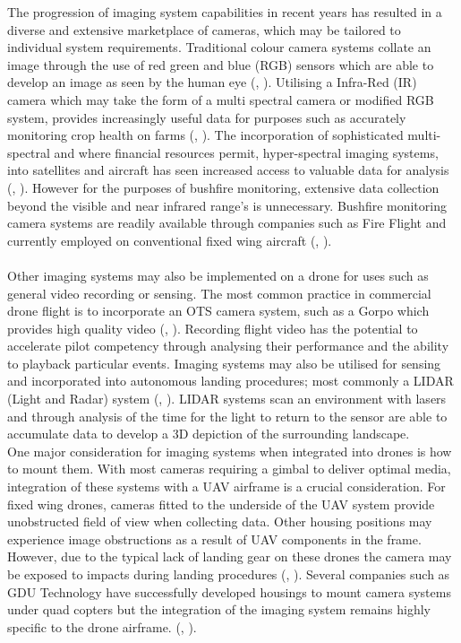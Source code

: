 The progression of imaging system capabilities in recent years has resulted in a diverse and extensive marketplace of cameras, which may be tailored to individual system requirements. Traditional colour camera systems collate an image through the use of red green and blue (RGB) sensors which are able to develop an image as seen by the human eye (\citeauthor{Sam1}, \citeyear{Sam1}). Utilising a Infra-Red (IR) camera which may take the form of a multi spectral camera or modified RGB system, provides increasingly useful data for purposes such as accurately monitoring crop health on farms (\citeauthor{Sam1}, \citeyear{Sam1}). The incorporation of sophisticated multi-spectral and where financial resources permit, hyper-spectral imaging systems, into satellites and aircraft has seen  increased access to valuable data for analysis (\citeauthor{Sam2}, \citeyear{Sam2}). However for the purposes of bushfire monitoring, extensive data collection beyond the visible and near infrared range's is unnecessary. Bushfire monitoring camera systems are readily available through companies such as Fire Flight and currently employed on conventional fixed wing aircraft (\citeauthor{Sam6}, \citeyear{Sam6}). \\
\\
Other imaging systems may also be implemented on a drone for uses such as general video recording or sensing. The most common practice in commercial drone flight is to incorporate an OTS camera system, such as a Gorpo which provides high quality video (\citeauthor{Sam3}, \citeyear{Sam3}). Recording flight video has the potential to accelerate pilot competency through analysing their performance and the ability to playback particular events. Imaging systems may also be utilised for sensing and incorporated into autonomous landing procedures; most commonly a LIDAR (Light and Radar) system (\citeauthor{Sam4}, \citeyear{Sam4}). LIDAR systems scan an environment with lasers and through analysis of the time for the light to return to the sensor are able to accumulate data to develop a 3D depiction of the surrounding landscape.\\ %

One major consideration for imaging systems when integrated into drones is how to mount them. With most cameras requiring a gimbal to deliver optimal media, integration of these systems with a UAV airframe is a crucial consideration. For fixed wing drones, cameras fitted to the underside of the UAV system provide unobstructed field of view when collecting data. Other housing positions may experience image obstructions as a result of UAV components in the frame. However, due to the typical lack of landing gear on these drones the camera may be exposed to impacts during landing procedures (\citeauthor{Sam5}, \citeyear{Sam5}). Several companies such as GDU Technology have successfully developed housings to mount camera systems under quad copters but the integration of the imaging system remains highly specific to the drone airframe. (\citeauthor{Sam5}, \citeyear{Sam5}).
% 


